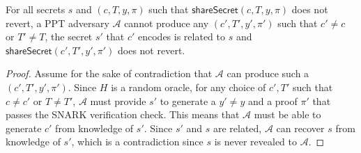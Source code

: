    \begin{theorem}
    For all secrets $s$ and $(c, T, y, \pi)$ such that $\textsf{shareSecret}(c, T, y, \pi)$ does not revert, a PPT adversary $\mathcal{A}$ cannot produce any $(c', T', y', \pi')$ such that $c' \neq c$ or $T' \neq T$, the secret $s'$ that $c'$ encodes is related to $s$ and $\textsf{shareSecret}(c', T', y', \pi')$ does not revert.
    \end{theorem}
    \begin{proof}
    Assume for the sake of contradiction that $\mathcal{A}$ can produce such a $(c', T', y', \pi')$.
    Since $H$ is a random oracle, for any choice of $c', T'$ such that $c \neq c'$ or $T \neq T'$, $\mathcal{A}$ must provide $s'$ to generate a $y' \neq y$ and a proof $\pi'$ that passes the SNARK verification check.
    This means that $\mathcal{A}$ must be able to generate $c'$ from knowledge of $s'$.
    Since $s'$ and $s$ are related, $\mathcal{A}$ can recover $s$ from knowledge of $s'$, which is a contradiction since $s$ is never revealed to $\mathcal{A}$.
    
    \end{proof}
    
        
        
            
        
        

